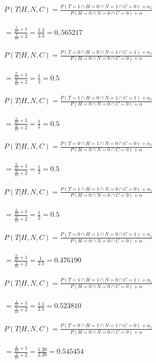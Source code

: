 \documentclass[a4paper]{article}
\begin{document}
$P(T|H,N,C)=\frac{P(T=1 \cap  H=0 \cap  N=1 \cap  C=0) +\alpha_1}{P(H=0 \cap N=0 \cap C=0) +\alpha}$
\\
\\
$=\frac{\frac{3}{10}+1}{\frac{3}{10}+2}=\frac{1.3}{2.3}=0,565217$
\\
\\
$P(T|H,N,C)=\frac{P(T=0 \cap  H=0 \cap  N=1 \cap  C=1) +\alpha_1}{P(H=0 \cap N=0 \cap C=0) +\alpha}$
\\
\\
$=\frac{\frac{0}{10}+1}{\frac{0}{10}+2}=\frac{1}{2}=0.5$
\\
\\
$P(T|H,N,C)=\frac{P(T=1 \cap  H=0 \cap  N=1 \cap  C=1) +\alpha_1}{P(H=0 \cap N=0 \cap C=0) +\alpha}$
\\
\\
$=\frac{\frac{0}{10}+1}{\frac{0}{10}+2}=\frac{1}{2}=0.5$
\\
\\
$P(T|H,N,C)=\frac{P(T=0 \cap  H=1 \cap  N=0 \cap  C=0) +\alpha_1}{P(H=0 \cap N=0 \cap C=0) +\alpha}$
\\
\\
$=\frac{\frac{0}{10}+1}{\frac{0}{10}+2}=\frac{1}{2}=0.5$
\\
\\
$P(T|H,N,C)=\frac{P(T=1 \cap  H=1 \cap  N=0 \cap  C=0) +\alpha_1}{P(H=0 \cap N=0 \cap C=0) +\alpha}$
\\
\\
$=\frac{\frac{0}{10}+1}{\frac{0}{10}+2}=\frac{1}{2}=0.5$
\\
\\
$P(T|H,N,C)=\frac{P(T=0 \cap  H=1 \cap  N=0 \cap  C=1) +\alpha_1}{P(H=0 \cap N=0 \cap C=0) +\alpha}$
\\
\\
$=\frac{\frac{0}{10}+1}{\frac{1}{10}+2}=\frac{1.}{2.1}=0.476190$
\\
\\
$P(T|H,N,C)=\frac{P(T=1 \cap  H=1 \cap  N=0 \cap  C=1) +\alpha_1}{P(H=0 \cap N=0 \cap C=0) +\alpha}$
\\
\\
$=\frac{\frac{1}{10}+1}{\frac{1}{10}+2}=\frac{1.1}{2.1}=0.523810$
\\
\\
$P(T|H,N,C)=\frac{P(T=0 \cap  H=1 \cap  N=1 \cap  C=0) +\alpha_1}{P(H=0 \cap N=0 \cap C=0) +\alpha}$
\\
\\
$=\frac{\frac{2}{10}+1}{\frac{2}{10}+2}=\frac{1.20}{2.20}=0.545454$
\\
\end{document}
